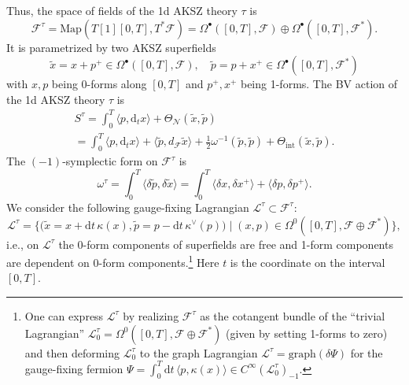 \documentclass{amsart}
\theoremstyle{plain} %
\theoremstyle{definition}
\theoremstyle{remark}
\newcommand{\mr}{\mathrm}
\newcommand{\bt}{\bullet}
\newcommand{\til}{\widetilde}
\newcommand{\F}{\mathcal{F}}
\newcommand{\LL}{\mathcal{L}}
\newcommand{\ii}{\mathrm{int}}
\newcommand{\N}{\mathcal{N}}
\newcommand{\dr}{\mathrm{d}}
\begin{document}
Thus, the space of fields of the 1d AKSZ theory $\tau$ is
\begin{equation}\label{1d AKSZ F^tau}
    \F^\tau = \mr{Map}(T[1][0,T]
    ,T^*\F)=\Omega^\bt([0,T],\F)\oplus \Omega^\bt([0,T],\F^*).
\end{equation}
It is parametrized by two AKSZ superfields 
\begin{equation}
\til{x}=x+p^+ \in \Omega^\bt([0,T],\F),\quad
\til{p}=p+x^+ \in \Omega^\bt([0,T],\F^*)
\end{equation}
with $x,p$ being 0-forms along $[0,T]$ and $p^+,x^+$ being 1-forms. The BV action of the 1d AKSZ theory $\tau$ is
\begin{multline}\label{S^tau}
    S^\tau=\int_0^T \langle p, \dr_t x\rangle + \Theta_\N(\til{x},\til{p})
    \\=
    \int_0^T \langle p,\dr_t x \rangle + \langle \til{p},d_\F \til{x} \rangle +\frac12 \omega^{-1}(\til{p},\til{p})+\Theta_\ii(\til{x},\til{p}).
\end{multline}
The $(-1)$-symplectic form on $\F^\tau$ is 
\begin{equation}\label{omega^tau}
    \omega^\tau=\int_0^T \langle \delta \til{p} ,\delta\til{x} \rangle=
    \int_0^T \langle \delta x,\delta x^+ \rangle + \langle \delta p,\delta p^+\rangle.
\end{equation}
We consider the following gauge-fixing Lagrangian $\LL^\tau\subset \F^\tau$:
\begin{equation}\label{L^tau}
    \LL^\tau=\Big\{\Big(\til{x}=x+\dr t\, \kappa(x),\til{p}=p-\dr t\, \kappa^\vee(p)\Big)\;\Big|\; (x,p)\in \Omega^0([0,T],\F\oplus \F^*)\Big\},
\end{equation}
i.e., on $\LL^\tau$ the 0-form components of superfields are free and 1-form components are dependent on 0-form components.\footnote{
One can express $\LL^\tau$ %
by realizing $\F^\tau$ as the cotangent bundle of the ``trivial Lagrangian'' $\LL^\tau_0=\Omega^0([0,T],\F\oplus\F^*)$ (given by setting 1-forms to zero) and then deforming $\LL^\tau_0$ to the graph Lagrangian
$\LL^\tau=\mr{graph}(\delta\Psi)$ for the gauge-fixing fermion $\Psi=\int_0^T \dr t \,\langle p,\kappa(x)\rangle\in C^\infty(\LL^\tau_0)_{-1}$. 
}
Here $t$ is the coordinate on the interval $[0,T]$.
\end{document}

